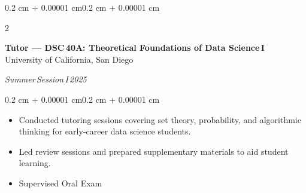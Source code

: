\documentclass[10pt, letterpaper]{article}
\newenvironment{highlights}{
    \begin{itemize}[
        topsep=0.10 cm,
        parsep=0.10 cm,
        partopsep=0pt,
        itemsep=0pt,
        leftmargin=0.4 cm + 10pt
    ]
}{\end{itemize}}
\newenvironment{onecolentry}{
    \begin{adjustwidth}{0.2 cm + 0.00001 cm}{0.2 cm + 0.00001 cm}
}{\end{adjustwidth}}
\newenvironment{twocolentry}[2][]{
    \onecolentry
    \def\secondColumn{#2}
    \setcolumnwidth{\fill, 4.5 cm}
    \begin{paracol}{2}
}{
    \switchcolumn \raggedleft \secondColumn
    \end{paracol}
    \endonecolentry
}
\begin{document}
    \vspace{0.15 cm}

    \begin{twocolentry}{\textit{Summer\,Session\,I\,2025}}
        \textbf{Tutor — DSC\,40A: Theoretical Foundations of Data Science\,I}\\
        University of California, San Diego
    \end{twocolentry}

    \vspace{0.10 cm}
    \begin{onecolentry}
        \begin{highlights}
            \item Conducted tutoring sessions covering set theory, probability, and algorithmic thinking for early‑career data science students.
            \item Led review sessions and prepared supplementary materials to aid student learning.
            \item Supervised Oral Exam
        \end{highlights}
    \end{onecolentry}

    \vspace{0.15 cm}




\end{document}
